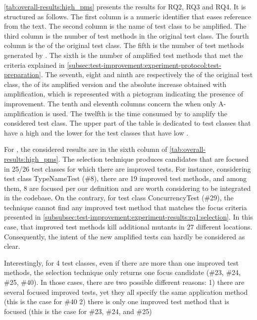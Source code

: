 \autoref{tab:overall-results:high_pms}
presents the results for RQ2, RQ3 and RQ4.%
It is structured as follows.
The first column is a numeric identifier that eases reference from the text.
The second column is the name of test class to be amplified.
The third column is the number of test methods in the original test class.
The fourth column is the \ms of the original test class.
The fifth is the number of test methods generated by \dspot.
The sixth is the number of amplified test methods that met the criteria explained in \autoref{subsec:test-improvement:experiment-protocol:test-preparation}.
The seventh, eight and ninth are respectively the \ams of the original test class, the \ams of its amplified version and the absolute increase obtained with amplification, which is represented with a pictogram indicating the presence of improvement. 
The tenth and eleventh columns concern the \ams when only A-amplification is used.
The twelfth is the time consumed by \dspot to amplify the considered test class. 
The upper part of the table is dedicated to test classes that have a high \ms and the lower for the test classes that have low \ms.

For \rqcandidates{}, the considered results are in the sixth column of \autoref{tab:overall-results:high_pms}.
The selection technique produces candidates that are focused in 25/26 test classes for which there are improved tests.
For instance, considering test class TypeNameTest (\#8), there are 19 improved test methods, and among them, 8 are focused per our definition and are worth considering to be integrated in the codebase.
On the contrary, for test class ConcurrencyTest (\#29), the technique cannot find any improved test method that matches the focus criteria presented in \autoref{subsubsec:test-improvement:experiment-results:rq1:selection}. In this case, that improved test methods kill additional mutants in 27 different locations. 
Consequently, the intent of the new amplified tests can  hardly be considered as clear.

Interestingly, for 4 test classes, even if there are more than one improved test methods, the selection technique only  returns one focus candidate (\#23, \#24, \#25, \#40). 
In those cases, there are two possible different reasons:
1) there are several focused improved tests, yet they all specify the same application method (this is the case for \#40
2) there is only one improved test method that is focused (this is the case for \#23, \#24, and \#25)

